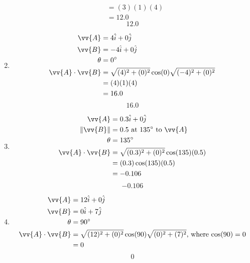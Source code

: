 \documentclass{article}
\begin{document}
\begin{enumerate}[label=\arabic*)]
\begin{align*}
                                & = (3)(1)(4) \\
                                & = 12.0
        \end{align*}
        \begin{equation*}
            \boxed{12.0}
        \end{equation*}
    \item
        \begin{align*}
            \vv{A} & = 4\hat{i} + 0\hat{j} \\
            \vv{B} & = -4\hat{i} + 0\hat{j} \\
            \theta & = 0\degree \\
            \vv{A} \cdot \vv{B} & = \sqrt{(4)^2 + (0)^2}\cos(0)\sqrt{(-4)^2 + (0)^2} \\
                                & = (4)(1)(4) \\
                                & = 16.0
        \end{align*}
        \begin{equation*}
            \boxed{16.0}
        \end{equation*}
    \item
        \begin{align*}
            \vv{A} & = 0.3\hat{i} + 0\hat{j} \\
            \|\vv{B}\| & = 0.5 \text{ at $ 135\degree $ to $ \vv{A} $} \\
            \theta & = 135\degree \\
            \vv{A} \cdot \vv{B} & = \sqrt{(0.3)^2 + (0)^2}\cos(135)(0.5) \\
                                & = (0.3)\cos(135)(0.5) \\
                                & = -0.106
        \end{align*}
        \begin{equation*}
            \boxed{-0.106}
        \end{equation*}
    \item
        \begin{align*}
            \vv{A} & = 12\hat{i} + 0\hat{j} \\
            \vv{B} & = 0\hat{i} + 7\hat{j} \\
            \theta & = 90\degree \\
            \vv{A} \cdot \vv{B} & = \sqrt{(12)^2 + (0)^2}\cos(90)\sqrt{(0)^2 + (7)^2} \text{, where $\cos(90) = 0$} \\
                                & = 0
        \end{align*}
        \begin{equation*}
            \boxed{0}
        \end{equation*}
\end{enumerate}
\end{document}

